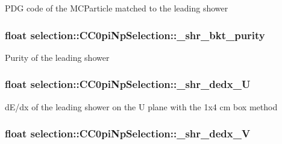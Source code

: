 P\-D\-G code of the M\-C\-Particle matched to the leading shower \hypertarget{classselection_1_1CC0piNpSelection_a1da68886d5b7a5b4eb1785649c48e8ef}{
\subsubsection[{\-\_\-shr\-\_\-bkt\-\_\-purity}]{\setlength{\rightskip}{0pt plus 5cm}float selection\-::\-C\-C0pi\-Np\-Selection\-::\-\_\-shr\-\_\-bkt\-\_\-purity\hspace{0.3cm}{\ttfamily [private]}}}\label{classselection_1_1CC0piNpSelection_a1da68886d5b7a5b4eb1785649c48e8ef}
Purity of the leading shower \hypertarget{classselection_1_1CC0piNpSelection_ada2f72c2f814e7d06c24a50ff5ad4fcc}{
\subsubsection[{\-\_\-shr\-\_\-dedx\-\_\-\-U}]{\setlength{\rightskip}{0pt plus 5cm}float selection\-::\-C\-C0pi\-Np\-Selection\-::\-\_\-shr\-\_\-dedx\-\_\-\-U\hspace{0.3cm}{\ttfamily [private]}}}\label{classselection_1_1CC0piNpSelection_ada2f72c2f814e7d06c24a50ff5ad4fcc}
d\-E/dx of the leading shower on the U plane with the 1x4 cm box method \hypertarget{classselection_1_1CC0piNpSelection_a392211f6d023d92bf113c20098c5e7fe}{
\subsubsection[{\-\_\-shr\-\_\-dedx\-\_\-\-V}]{\setlength{\rightskip}{0pt plus 5cm}float selection\-::\-C\-C0pi\-Np\-Selection\-::\-\_\-shr\-\_\-dedx\-\_\-\-V\hspace{0.3cm}{\ttfamily [private]}}}\label{classselection_1_1CC0piNpSelection_a392211f6d023d92bf113c20098c5e7fe}
